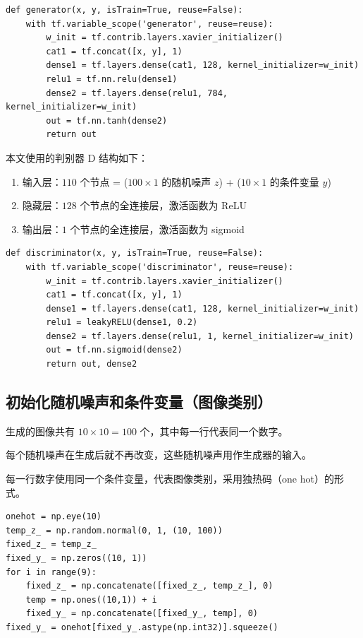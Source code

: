 \documentclass[a4paper, 12pt]{article}
\begin{document}
\begin{lstlisting}[style=myPython,caption={生成器 G}]
def generator(x, y, isTrain=True, reuse=False):
    with tf.variable_scope('generator', reuse=reuse):
        w_init = tf.contrib.layers.xavier_initializer()
        cat1 = tf.concat([x, y], 1)
        dense1 = tf.layers.dense(cat1, 128, kernel_initializer=w_init)
        relu1 = tf.nn.relu(dense1)
        dense2 = tf.layers.dense(relu1, 784, kernel_initializer=w_init)
        out = tf.nn.tanh(dense2)
        return out
\end{lstlisting}

本文使用的判别器 D 结构如下：
\begin{enumerate}[leftmargin=*,labelindent=2em]
\item 输入层：$110$ 个节点 = ($100 \times 1$ 的随机噪声 $z$) + ($10 \times 1$ 的条件变量 $y$)
\item 隐藏层：$128$ 个节点的全连接层，激活函数为 ReLU
\item 输出层：$1$ 个节点的全连接层，激活函数为 sigmoid
\end{enumerate}

\begin{lstlisting}[style=myPython,caption={判别器 D}]
def discriminator(x, y, isTrain=True, reuse=False):
    with tf.variable_scope('discriminator', reuse=reuse):
        w_init = tf.contrib.layers.xavier_initializer()
        cat1 = tf.concat([x, y], 1)
        dense1 = tf.layers.dense(cat1, 128, kernel_initializer=w_init)
        relu1 = leakyRELU(dense1, 0.2)
        dense2 = tf.layers.dense(relu1, 1, kernel_initializer=w_init)
        out = tf.nn.sigmoid(dense2)
        return out, dense2
\end{lstlisting}

\subsection{初始化随机噪声和条件变量（图像类别）}

生成的图像共有 $10 \times 10 = 100$ 个，其中每一行代表同一个数字。

每个随机噪声在生成后就不再改变，这些随机噪声用作生成器的输入。

每一行数字使用同一个条件变量，代表图像类别，采用独热码（one hot）的形式。

\begin{lstlisting}[style=myPython,caption={初始化随机噪声和条件变量（图像类别）}]
onehot = np.eye(10)
temp_z_ = np.random.normal(0, 1, (10, 100))
fixed_z_ = temp_z_
fixed_y_ = np.zeros((10, 1))
for i in range(9):
    fixed_z_ = np.concatenate([fixed_z_, temp_z_], 0)
    temp = np.ones((10,1)) + i
    fixed_y_ = np.concatenate([fixed_y_, temp], 0)
fixed_y_ = onehot[fixed_y_.astype(np.int32)].squeeze()
\end{lstlisting}
\end{document}
